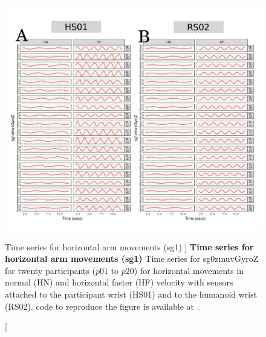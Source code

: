 \begin{figure}
\centering
\includegraphics[width=1.0\textwidth]{ts_H_sg1}
    	\caption
	[Time series for horizontal arm movements (sg1) ]{
	{\bf Time series for horizontal arm movements (sg1)}
		Time series for sg0zmuvGyroZ for twenty participants 
		($p01$ to  $p20$) 
		for horizontal movements in normal (HN) and horizontal faster (HF) 
		velocity with sensors attached to the participant wrist (HS01)
		and to the humanoid wrist (RS02).
	\R code to reproduce the figure is available at 
	.
        }
    \label{fig:aH-sg1}
\end{figure}

